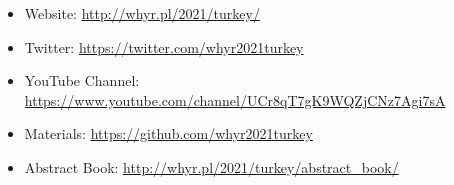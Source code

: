 \begin{itemize}
    \item Website: \url{http://whyr.pl/2021/turkey/}
    \item Twitter: \url{https://twitter.com/whyr2021turkey} 
    \item YouTube Channel: \url{https://www.youtube.com/channel/UCr8qT7gK9WQZjCNz7Agi7sA}
    \item Materials: \url{https://github.com/whyr2021turkey}
    \item Abstract Book: \url{http://whyr.pl/2021/turkey/abstract_book/}
\end{itemize}




\newpage
\address{Mustafa Cavus\\
  Eskisehir Technical University\\
  Department of Statistics\\
  Eskisehir, Turkey\\
  \url{https://orcid.org/0000-0002-6172-5449}\\
  }

\address{Olgun Aydın\\
  Gdańsk University of Technology\\
  Gdańsk, Poland\\
  Department of Statistics\\
  \url{https://orcid.org/0000-0002-7090-0931}\\
  }

\address{Ozan Evkaya\\
  Padova University\\
  Department of Statistical Sciences\\
  Padova, Italy\\
  \url{https://orcid.org/0000-0002-5076-8144}\\
  }
  
\address{Ozancan Ozdemir\\
  Middle East Technical University\\
  Department of Statistics\\
  Ankara, Turkey\\
  \url{https://orcid.org/0000-0002-7850-3885}\\
  }
  
\address{Deniz Bezer\\
  Middle East Technical University\\
  Department of Statistics\\
  Ankara, Turkey\\
  }
  
\address{Ugur Dar\\
  Eskisehir Technical University\\
  Department of Statistics\\
  Eskisehir, Turkey\\
  }

